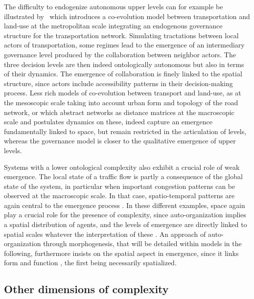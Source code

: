 \documentclass[fleqn,10pt]{wlscirep}
\begin{document}
The difficulty to endogenize autonomous upper levels can for example be illustrated by~\cite{lenechet:halshs-01272236} which introduces a co-evolution model between transportation and land-use at the metropolitan scale integrating an endogenous governance structure for the transportation network. Simulating tractations between local actors of transportation, some regimes lead to the emergence of an intermediary governance level produced by the collaboration between neighbor actors. The three decision levels are then indeed ontologically autonomous but also in terms of their dynamics. The emergence of collaboration is finely linked to the spatial structure, since actors include accessibility patterns in their decision-making process. Less rich models of co-evolution between transport and land-use, as \cite{raimbault2018urban} at the mesoscopic scale taking into account urban form and topology of the road network, or \cite{raimbault2018modeling} which abstract networks as distance matrices at the macroscopic scale and postulates dynamics on these, indeed capture an emergence fundamentally linked to space, but remain restricted in the articulation of levels, whereas the governance model is closer to the qualitative emergence of upper levels.


Systems with a lower ontological complexity also exhibit a crucial role of weak emergence. The local state of a traffic flow is partly a consequence of the global state of the system, in particular when important congestion patterns can be observed at the macroscopic scale. In that case, spatio-temporal patterns are again central to the emergence process \cite{treiber2010three}. In these different examples, space again play a crucial role for the presence of complexity, since auto-organization implies a spatial distribution of agents, and the levels of emergence are directly linked to spatial scales whatever the interpretation of these \cite{manson2008does}. An approach of auto-organization through morphogenesis, that will be detailed within models in the following, furthermore insists on the spatial aspect in emergence, since it links form and function \cite{doursat2012morphogenetic}, the first being necessarily spatialized.







\subsection*{Other dimensions of complexity}
\end{document}

